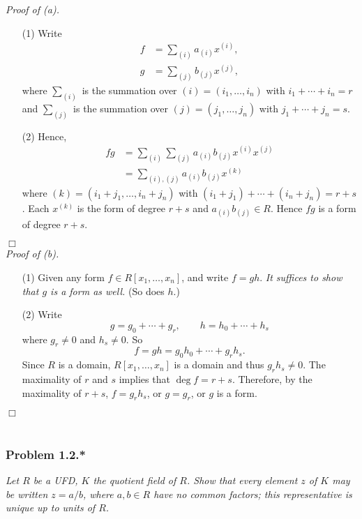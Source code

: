 \documentclass{article}
\begin{document}
\emph{Proof of (a).}
\begin{enumerate}
\item[(1)]
  Write
  \begin{align*}
    f &= \sum_{(i)} a_{(i)} x^{(i)}, \\
    g &= \sum_{(j)} b_{(j)} x^{(j)},
  \end{align*}
  where $\sum_{(i)}$ is the summation over $(i) = (i_1,\ldots,i_n)$ with $i_1+\cdots+i_n = r$
  and $\sum_{(j)}$ is the summation over $(j) = (j_1,\ldots,j_n)$ with $j_1+\cdots+j_n = s$.

\item[(2)]
  Hence,
  \begin{align*}
    fg
    &= \sum_{(i)} \sum_{(j)} a_{(i)}b_{(j)} x^{(i)}x^{(j)} \\
    &= \sum_{(i),(j)} a_{(i)}b_{(j)} x^{(k)}
  \end{align*}
  where $(k) = (i_1+j_1,\ldots,i_n+j_n)$ with $(i_1+j_1)+\cdots+(i_n+j_n) = r+s$.
  Each $x^{(k)}$ is the form of degree $r+s$ and $a_{(i)}b_{(j)} \in R$.
  Hence $fg$ is a form of degree $r+s$.
\end{enumerate}
$\Box$ \\



\emph{Proof of (b).}
\begin{enumerate}
\item[(1)]
  Given any form $f \in R[x_1,\ldots,x_n]$, and write $f = gh$.
  \emph{It suffices to show that $g$ is a form as well.}
  (So does $h$.)

\item[(2)]
  Write
  \[
    g = g_0+\cdots+g_r,
    \qquad
    h = h_0+\cdots+h_s
  \]
  where $g_r \neq 0$ and $h_s \neq 0$.
  So
  \[
    f = gh = g_0h_0 + \cdots + g_r h_s.
  \]
  Since $R$ is a domain, $R[x_1,\ldots,x_n]$ is a domain and thus $g_r h_s \neq 0$.
  The maximality of $r$ and $s$ implies that $\deg f = r+s$.
  Therefore, by the maximality of $r+s$,
  $f = g_r h_s$, or $g = g_r$, or $g$ is a form.
\end{enumerate}
$\Box$ \\\\






\subsubsection*{Problem 1.2.*}
\emph{Let $R$ be a UFD,
$K$ the quotient field of $R$.
Show that every element $z$ of $K$ may be written $z = a/b$,
where $a, b \in R$ have no common factors;
this representative is unique up to units of $R$.} \\
\end{document}
